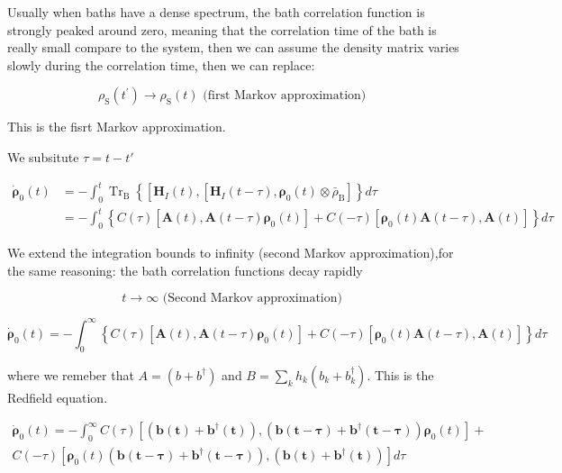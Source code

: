 \documentclass[%
preprint,
onecolumn,
notitlepag,
 amsmath,amssymb,
 aps,
 pra,
]{revtex4-2}
\begin{document}
Usually when baths have a dense spectrum, the bath correlation function is strongly peaked around zero, meaning that the correlation time of the bath is really small compare to the system, then we can assume the density matrix varies slowly during the correlation time, then  we can replace: 


\begin{equation}\rho_{\mathrm{S}}\left(t^{\prime}\right) \rightarrow \rho_{\mathrm{S}}(t) \text { (first Markov approximation) }\end{equation}

This is the fisrt Markov approximation.  

We subsitute $\tau=t-t'$


\begin{equation}\begin{aligned}
\dot{\boldsymbol{\rho}}_0(t) &=-\int_{0}^{t} \operatorname{Tr}_{\mathrm{B}}\left\{\left[\boldsymbol{H}_{I}(t),\left[\boldsymbol{H}_{I}(t-\tau), \boldsymbol{\rho}_{\mathrm{0}}(t) \otimes \bar{\rho}_{\mathrm{B}}\right]\right\} d \tau\right.\\
&=- \int_{0}^{t}\left\{C(\tau)\left[\boldsymbol{A}(t), \boldsymbol{A}(t-\tau) \boldsymbol{\rho}_{\mathrm{0}}(t)\right]+C(-\tau)\left[\boldsymbol{\rho}_{\mathrm{0}}(t) \boldsymbol{A}(t-\tau), \boldsymbol{A}(t)\right]\right\} d \tau
\end{aligned}\end{equation}

We extend the integration bounds
to infinity (second Markov approximation),for the same reasoning: the bath correlation
functions decay rapidly

\begin{equation}
t \rightarrow \infty \text { (Second Markov approximation) }
\end{equation}


\begin{equation}
\dot{\boldsymbol{\rho}}_0(t) = -\int_{0}^{\infty}\left\{C(\tau)\left[\boldsymbol{A}(t), \boldsymbol{A}(t-\tau) \boldsymbol{\rho}_{\mathrm{0}}(t)\right]+C(-\tau)\left[\boldsymbol{\rho}_{\mathrm{0}}(t) \boldsymbol{A}(t-\tau), \boldsymbol{A}(t)\right]\right\} d \tau
\end{equation}



where we remeber that $A= \left( b + b ^{\dagger} \right) $ and $B= \sum_k h_k \left( b_k + b_k ^{\dagger} \right)$. This is the Redfield equation. 


\begin{align}
\dot{\boldsymbol{\rho}}_0(t) = - \int_{0}^{\infty} C(\tau)\left[\boldsymbol{\left( b(t) + b ^{\dagger}(t) \right)}, \left( \boldsymbol{ b(t-\tau) + b ^{\dagger} (t-\tau) }\right) \boldsymbol{\rho}_{\mathrm{0}}(t)\right]+ \\
C(-\tau)\left[\boldsymbol{\rho}_{\mathrm{0}}(t) \left( \boldsymbol{ b(t-\tau) + b ^{\dagger} (t-\tau) } \right), \boldsymbol{\left( b(t) + b ^{\dagger}(t) \right)}\right] d \tau 
\end{align}
\end{document}
